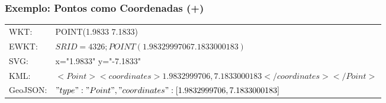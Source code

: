 \documentclass[hyperref={pdfpagelabels=true}]{beamer}
\begin{document}
\begin{frame}
\frametitle{Exemplo: Pontos como Coordenadas (+)}


\tiny{
\begin{tabular}{ l l }
  WKT: & POINT(1.9833 7.1833) \\
  EWKT: & $SRID=4326;POINT(1.9832999706 7.1833000183)$ \\
  SVG: &  x="1.9833" y="-7.1833" \\
  KML: & $<Point><coordinates>1.9832999706,7.1833000183</coordinates></Point>$ \\
  GeoJSON: & ${"type":"Point","coordinates":[1.9832999706,7.1833000183]}$ \\
\end{tabular}
}

\end{frame}
 
\end{document}
